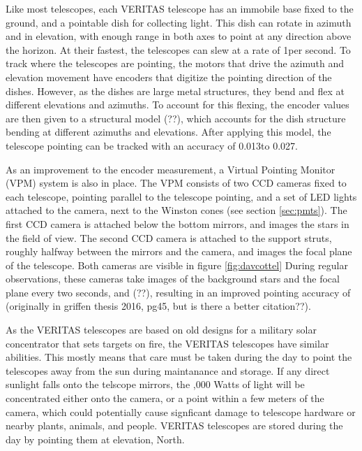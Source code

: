Like most telescopes, each VERITAS telescope has an immobile base fixed to the ground, and a pointable dish for collecting light.
This dish can rotate in azimuth and in elevation, with enough range in both axes to point at any direction above the horizon.
At their fastest, the telescopes can slew at a rate of 1\degree per second.
To track where the telescopes are pointing, the motors that drive the azimuth and elevation movement have encoders that digitize the pointing direction of the dishes.
However, as the dishes are large metal structures, they bend and flex at different elevations and azimuths.
To account for this flexing, the encoder values are then given to a structural model (??), which accounts for the dish structure bending at different azimuths and elevations.
After applying this model, the telescope pointing can be tracked with an accuracy of 0.013\degree to 0.027\degree \cite{Veritas_Detector}.

As an improvement to the encoder measurement, a Virtual Pointing Monitor (VPM) system is also in place.
The VPM consists of two CCD cameras fixed to each telescope, pointing parallel to the telescope pointing, and a set of LED lights attached to the camera, next to the Winston cones (see section \ref{sec:pmts}).
The first CCD camera is attached below the bottom mirrors, and images the stars in the field of view.
The second CCD camera is attached to the support struts, roughly halfway between the mirrors and the camera, and images the focal plane of the telescope.
Both cameras are visible in figure \ref{fig:davcottel}
During regular observations, these cameras take images of the background stars and the focal plane every two seconds, and (??), resulting in an improved pointing accuracy of \degree (originally in griffen thesis 2016, pg45, but is there a better citation??).

As the VERITAS telescopes are based on old designs for a military solar concentrator that sets targets on fire\cite{daviescotton}, the VERITAS telescopes have similar abilities.
This mostly means that care must be taken during the day to point the telescopes away from the sun during maintanance and storage.
If any direct sunlight falls onto the telscope mirrors, the ,000 Watts of light will be concentrated either onto the camera, or a point within a few meters of the camera, which could potentially cause signficant damage to telescope hardware or nearby plants, animals, and people.
VERITAS telescopes are stored during the day by pointing them at \degree elevation, North.


